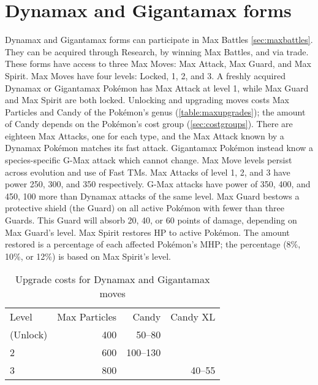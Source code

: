 \section{Dynamax and Gigantamax forms}
\label{sec:dmaxgmax}
Dynamax and Gigantamax forms can participate in Max Battles \autoref{sec:maxbattles}.
They can be acquired through Research, by winning Max Battles, and via trade.
These forms have access to three Max Moves: Max Attack, Max Guard, and Max Spirit.
Max Moves have four levels: Locked, 1, 2, and 3.
A freshly acquired Dynamax or Gigantamax Pokémon has Max Attack at level 1, while Max Guard and Max Spirit are both locked.
Unlocking and upgrading moves costs Max Particles and Candy of the Pokémon's genus (\autoref{table:maxupgrades});
 the amount of Candy depends on the Pokémon's cost group (\autoref{sec:costgroups}).
There are eighteen Max Attacks, one for each type, and the Max Attack known by a Dynamax Pokémon matches its fast attack.
Gigantamax Pokémon instead know a species-specific G-Max attack which cannot change.
Max Move levels persist across evolution and use of Fast TMs.
Max Attacks of level 1, 2, and 3 have power 250, 300, and 350
  respectively.
G-Max attacks have power of 350, 400, and 450, 100 more than Dynamax attacks of the same level.
Max Guard bestows a protective shield (the Guard) on all active Pokémon
  with fewer than three Guards.
This Guard will absorb 20, 40, or 60 points of damage, depending on Max Guard's level.
Max Spirit restores HP to active Pokémon.
The amount restored is a percentage of each affected Pokémon's MHP;
  the percentage (8\%, 10\%, or 12\%) is based on Max Spirit's level.
\begin{table}
\centering
\begin{tabular}{lrrr}
  Level & Max Particles & Candy & Candy XL\\
  \Midrule
  1 (Unlock) & 400 & 50--80 &\\
  2          & 600 & 100--130 &\\
  3          & 800 & & 40--55\\
\end{tabular}
\caption{Upgrade costs for Dynamax and Gigantamax moves}
\label{table:maxupgrades}
\end{table}


\clearpage
